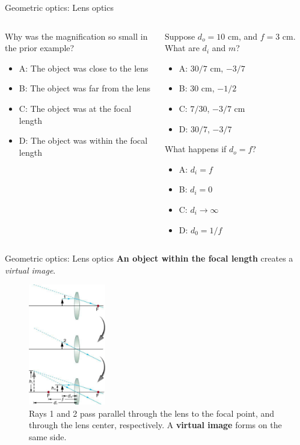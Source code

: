 \documentclass{beamer}
\begin{document}
\begin{frame}{Geometric optics: Lens optics}
\begin{columns}[T]
\begin{column}{0.5\textwidth}
Why was the magnification so small in the prior example?
\begin{itemize}
\item A: The object was close to the lens
\item B: The object was far from the lens
\item C: The object was at the focal length
\item D: The object was within the focal length
\end{itemize}
\end{column}
\begin{column}{0.5\textwidth}
Suppose $d_o = 10$ cm, and $f = 3$ cm.  What are $d_i$ and $m$?
\begin{itemize}
\item A: $30/7$ cm, $-3/7$
\item B: $30$ cm, $-1/2$
\item C: $7/30$, $-3/7$ cm
\item D: $30/7$, $-3/7$
\end{itemize}
What happens if $d_o = f$?
\begin{itemize}
\item A: $d_i = f$
\item B: $d_i = 0$
\item C: $d_i \to \infty$
\item D: $d_0 = 1/f$
\end{itemize}
\end{column}
\end{columns}
\end{frame}

\begin{frame}{Geometric optics: Lens optics}
\textbf{\alert{An object within the focal length}} creates a \textit{virtual image}.
\begin{figure}
\centering
\includegraphics[width=0.3\textwidth]{figures/virtual.png}
\caption{\label{fig:lens3} \small Rays 1 and 2 pass parallel through the lens to the focal point, and through the lens center, respectively.  A \textbf{virtual image} forms on the same side.}
\end{figure}
\end{frame}
\end{document}
